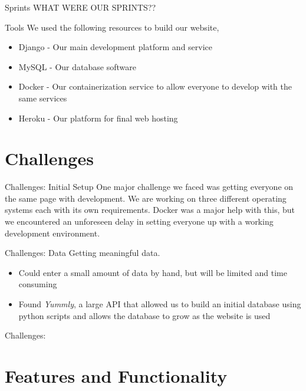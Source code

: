 \documentclass[10pt]{beamer}
\begin{document}
\begin{frame}{Sprints}
	WHAT WERE OUR SPRINTS??
\end{frame}


\begin{frame}{Tools}
	We used the following resources to build our website,
    \begin{itemize}
    	\item \alert{Django} - Our main development platform and service
        \item \alert{MySQL} - Our database software
        \item \alert{Docker} - Our containerization service to allow everyone to develop with the same services
        \item \alert{Heroku} - Our platform for final web hosting
    \end{itemize}
\end{frame}

\section{Challenges}

\begin{frame}{Challenges: Initial Setup}
	One major challenge we faced was getting everyone on the same page with development. We are working on three different operating systems each with its own requirements. Docker was a major help with this, but we encountered an unforeseen delay in setting everyone up with a working development environment.
\end{frame}

\begin{frame}{Challenges: Data}
Getting meaningful data.
\begin{itemize}
	\item Could enter a small amount of data by hand, but will be limited and time consuming
    \item Found \textit{Yummly}, a large API that allowed us to build an initial database using python scripts and allows the database to grow as the website is used
\end{itemize}
\end{frame}

\begin{frame}{Challenges: }

\end{frame}

\section{Features and Functionality}
\end{document}
